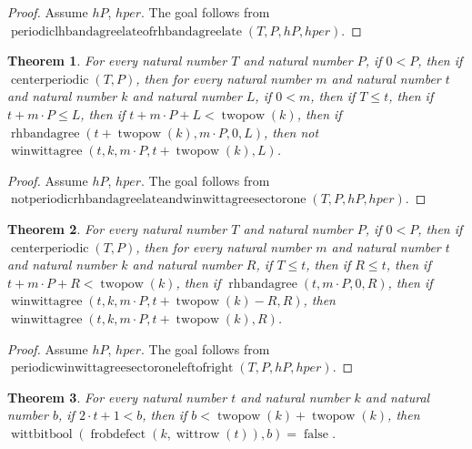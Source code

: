 \documentclass[11pt]{article}
\newtheorem{theorem}{Theorem}[section]
\theoremstyle{definition}
\begin{document}
\begin{proof}
Assume \(hP\), \(hper\).
The goal follows from \(\operatorname{periodiclhbandagreelateofrhbandagreelate}(T, P, hP, hper)\).
\end{proof}
\begin{theorem}
\label{ll:paper:not-periodic-rhbandagree-late-and-winwittagree-sector-one}
For every natural number \(T\) and natural number \(P\), if \(0 < P\), then if \(\operatorname{centerperiodic}(T, P)\), then for every natural number \(m\) and natural number \(t\) and natural number \(k\) and natural number \(L\), if \(0 < m\), then if \(T \le t\), then if \(t + m \cdot P \le L\), then if \(t + m \cdot P + L < \operatorname{twopow}(k)\), then if \(\operatorname{rhbandagree}(t + \operatorname{twopow}(k), m \cdot P, 0, L)\), then not \(\operatorname{winwittagree}(t, k, m \cdot P, t + \operatorname{twopow}(k), L)\).
\end{theorem}
\begin{proof}
Assume \(hP\), \(hper\).
The goal follows from \(\operatorname{notperiodicrhbandagreelateandwinwittagreesectorone}(T, P, hP, hper)\).
\end{proof}
\begin{theorem}
\label{ll:paper:periodic-winwittagree-sector-one-left-of-right}
For every natural number \(T\) and natural number \(P\), if \(0 < P\), then if \(\operatorname{centerperiodic}(T, P)\), then for every natural number \(m\) and natural number \(t\) and natural number \(k\) and natural number \(R\), if \(T \le t\), then if \(R \le t\), then if \(t + m \cdot P + R < \operatorname{twopow}(k)\), then if \(\operatorname{rhbandagree}(t, m \cdot P, 0, R)\), then if \(\operatorname{winwittagree}(t, k, m \cdot P, t + \operatorname{twopow}(k) - R, R)\), then \(\operatorname{winwittagree}(t, k, m \cdot P, t + \operatorname{twopow}(k), R)\).
\end{theorem}
\begin{proof}
Assume \(hP\), \(hper\).
The goal follows from \(\operatorname{periodicwinwittagreesectoroneleftofright}(T, P, hP, hper)\).
\end{proof}
\begin{theorem}
\label{ll:paper:frobdefect-row-testbit-gt-two-mul-eq-false}
For every natural number \(t\) and natural number \(k\) and natural number \(b\), if \(2 \cdot t + 1 < b\), then if \(b < \operatorname{twopow}(k) + \operatorname{twopow}(k)\), then \(\operatorname{wittbitbool}(\operatorname{frobdefect}(k, \operatorname{wittrow}(t)), b) = \operatorname{false}\).
\end{theorem}
\end{document}
